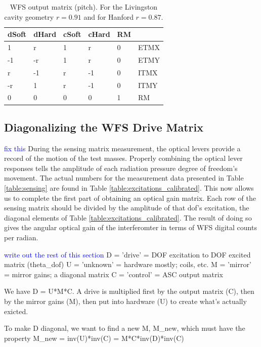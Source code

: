 \begin{table}
\centering
\caption[WFS output matrix]{WFS output matrix (pitch). For the Livingston cavity geometry
  $r=0.91$ and for Hanford $r=0.87$.}
\begin{tabular}{l l l l l l}
\hline 
dSoft & dHard & cSoft & cHard & RM & \\
\hline 
1 & r & 1 & r & 0 & ETMX\\
-1 & -r & 1 & r & 0 & ETMY \\
r & -1 & r & -1 & 0 & ITMX\\
-r & 1 & r & -1 & 0 & ITMY\\
 0 & 0 & 0 & 0 & 1 & RM\\
\hline
\end{tabular}
\label{table:output}
\end{table}


\subsection{Diagonalizing the WFS Drive Matrix}

\textcolor{blue}{fix this} During the sensing matrix measurement, the optical levers provide a
record of the motion of the test masses. Properly combining the
optical lever responses tells the amplitude of each radiation pressure
degree of freedom's movement. The actual numbers for the measurement
data presented in Table \ref{table:sensing} are found in Table
\ref{table:excitations_calibrated}. This now allows us to complete the
first part of obtaining an optical gain matrix. Each row of the
sensing matrix should be divided by the amplitude of that dof's
excitation, the diagonal elements of Table
\ref{table:excitations_calibrated}. The result of doing so gives the
angular optical gain of the interferomter in terms of WFS digital
counts per radian.


\textcolor{blue}{write out the rest of this section}
D = 'drive' = DOF excitation to DOF excited matrix (theta\_dof)
U = 'unknown' = hardware mostly; coils, etc.
M = 'mirror' = mirror gains; a diagonal matrix
C = 'control' = ASC output matrix

We have D = U*M*C. A drive is multiplied first by the output matrix (C),
then by the mirror gains (M), then put into hardware (U) to create what's
actually exicted.

To make D diagonal, we want to find a new M, M\_new, which must have the
property M\_new = inv(U)*inv(C) = M*C*inv(D)*inv(C)


